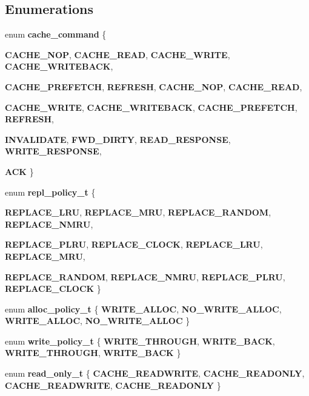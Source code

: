 \subsection*{Enumerations}
\begin{CompactItemize}
\item 
enum {\bf cache\_\-command} \{ \par
{\bf CACHE\_\-NOP}, 
{\bf CACHE\_\-READ}, 
{\bf CACHE\_\-WRITE}, 
{\bf CACHE\_\-WRITEBACK}, 
\par
{\bf CACHE\_\-PREFETCH}, 
{\bf REFRESH}, 
{\bf CACHE\_\-NOP}, 
{\bf CACHE\_\-READ}, 
\par
{\bf CACHE\_\-WRITE}, 
{\bf CACHE\_\-WRITEBACK}, 
{\bf CACHE\_\-PREFETCH}, 
{\bf REFRESH}, 
\par
{\bf INVALIDATE}, 
{\bf FWD\_\-DIRTY}, 
{\bf READ\_\-RESPONSE}, 
{\bf WRITE\_\-RESPONSE}, 
\par
{\bf ACK}
 \}
\item 
enum {\bf repl\_\-policy\_\-t} \{ \par
{\bf REPLACE\_\-LRU}, 
{\bf REPLACE\_\-MRU}, 
{\bf REPLACE\_\-RANDOM}, 
{\bf REPLACE\_\-NMRU}, 
\par
{\bf REPLACE\_\-PLRU}, 
{\bf REPLACE\_\-CLOCK}, 
{\bf REPLACE\_\-LRU}, 
{\bf REPLACE\_\-MRU}, 
\par
{\bf REPLACE\_\-RANDOM}, 
{\bf REPLACE\_\-NMRU}, 
{\bf REPLACE\_\-PLRU}, 
{\bf REPLACE\_\-CLOCK}
 \}
\item 
enum {\bf alloc\_\-policy\_\-t} \{ {\bf WRITE\_\-ALLOC}, 
{\bf NO\_\-WRITE\_\-ALLOC}, 
{\bf WRITE\_\-ALLOC}, 
{\bf NO\_\-WRITE\_\-ALLOC}
 \}
\item 
enum {\bf write\_\-policy\_\-t} \{ {\bf WRITE\_\-THROUGH}, 
{\bf WRITE\_\-BACK}, 
{\bf WRITE\_\-THROUGH}, 
{\bf WRITE\_\-BACK}
 \}
\item 
enum {\bf read\_\-only\_\-t} \{ {\bf CACHE\_\-READWRITE}, 
{\bf CACHE\_\-READONLY}, 
{\bf CACHE\_\-READWRITE}, 
{\bf CACHE\_\-READONLY}
 \}
\end{CompactItemize}
